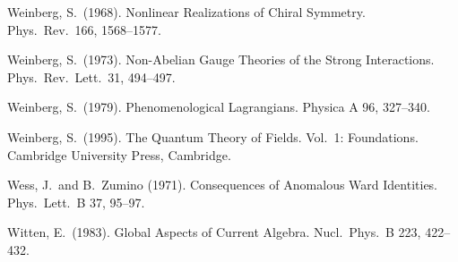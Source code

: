 \documentclass[twoside,12pt]{article}
\begin{document}
\begin{thebibliography}{}
Weinberg, S.~(1968).
Nonlinear Realizations of Chiral Symmetry.
Phys.\ Rev.\  166, 1568--1577.

Weinberg, S.~(1973).
Non-Abelian Gauge Theories of the Strong Interactions.
Phys.\ Rev.\ Lett.\  31, 494--497.

Weinberg, S.~(1979).
Phenomenological Lagrangians.
Physica A 96, 327--340.

Weinberg, S.~(1995).
The Quantum Theory of Fields. Vol.~1: Foundations.
Cambridge University Press, Cambridge.

Wess, J.~and B.~Zumino (1971).
Consequences of Anomalous Ward Identities.
Phys.\ Lett.\  B 37, 95--97.

Witten, E.~(1983).
Global Aspects of Current Algebra.
Nucl.\ Phys.\  B 223, 422--432.

\end{thebibliography}
\end{document}
